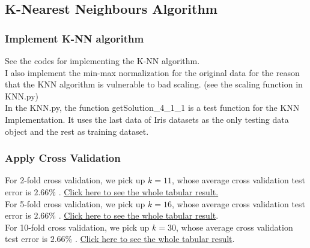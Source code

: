\documentclass[11pt,a4paper]{article}
\newcommand{\htab}{\hspace*{0.63cm}}
\begin{document}
\subsection{K-Nearest Neighbours Algorithm}
\subsubsection{Implement K-NN algorithm}
\htab See the codes for implementing the K-NN algorithm. \\
\htab I also implement the min-max normalization for the original data for the reason that the KNN algorithm is vulnerable to bad scaling. (see the scaling function in KNN.py) \\
\htab In the KNN.py, the function getSolution\_4\_1\_1 is a test function for the KNN Implementation. It uses the last data of Iris datasets as the only testing data object and the rest as training dataset. 

\subsubsection{Apply Cross Validation}
\htab For 2-fold cross validation, we pick up $ k = 11 $, 
whose average cross validation test error is $ 2.66 \% $ . 
\hyperlink{twoFoldResult}{Click here to see the whole tabular result.} \\

For 5-fold cross validation, we pick up $ k = 16 $, 
whose average cross validation test error is $ 2.66 \% $ . 
\hyperlink{fiveFoldResult}{Click here to see the whole tabular result}. \\

For 10-fold cross validation, we pick up $ k = 30 $, 
whose average cross validation test error is $ 2.66 \% $ . 
\hyperlink{tenFoldResult}{Click here to see the whole tabular result}. \\

\newpage
\end{document}
